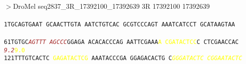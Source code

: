 \documentclass[11pt,twoside,reqno,a4paper]{article}
\begin{document}
\\
$>$DroMel	seq2837\_3R\_17392100\_17392639	3R	17392100	17392639 \\
 \\
\texttt{1\hspace*{3\charwidth}TGCAGTGAAT	GCAACTTGTA	AATCTGTCAC	GCGTCCCAGT	AAATCATCCT	GCATAAGTAA	\\
\hspace*{4\charwidth}\hspace*{1\charwidth}\hspace*{1\charwidth}\hspace*{1\charwidth}\hspace*{1\charwidth}\hspace*{1\charwidth}\hspace*{1\charwidth}\\
61\hspace*{2\charwidth}TGTGC\textit{\textcolor{Brown}{A}}\textit{\textcolor{Brown}{G}}\textit{\textcolor{Brown}{T}}\textit{\textcolor{Brown}{T}}\textit{\textcolor{Brown}{T}}	\textit{\textcolor{Brown}{A}}\textit{\textcolor{Brown}{G}}\textit{\textcolor{Brown}{C}}\textit{\textcolor{Brown}{C}}\textit{\textcolor{Brown}{C}}GGAGA	ACACACCCAG	AATTCGAAA\textcolor{Yellow}{A}	\textcolor{Yellow}{C}\textcolor{Yellow}{G}\textcolor{Yellow}{A}\textcolor{Yellow}{T}\textcolor{Yellow}{A}\textcolor{Yellow}{C}\textcolor{Yellow}{T}\textcolor{Yellow}{C}\textcolor{Yellow}{C}C	CTCGAACCAC	\\
\hspace*{4\charwidth}\hspace*{5\charwidth}\textit{\textcolor{Brown}{9.2}}\hspace*{1\charwidth}\hspace*{1\charwidth}\hspace*{1\charwidth}\hspace*{31\charwidth}\textcolor{Yellow}{9.0}\hspace*{1\charwidth}\hspace*{1\charwidth}\hspace*{1\charwidth}\\
121\hspace*{1\charwidth}TTTGTCACTC	\textcolor{Yellow}{G}\textcolor{Yellow}{A}\textcolor{Yellow}{G}\textcolor{Yellow}{A}\textcolor{Yellow}{T}\textcolor{Yellow}{A}\textcolor{Yellow}{C}\textcolor{Yellow}{T}\textcolor{Yellow}{C}\textcolor{Yellow}{G}	AAATACCCGA	GGAGACACTG	C\textit{\textcolor{Yellow}{G}}\textit{\textcolor{Yellow}{G}}\textit{\textcolor{Yellow}{G}}\textit{\textcolor{Yellow}{A}}\textit{\textcolor{Yellow}{T}}\textit{\textcolor{Yellow}{A}}\textit{\textcolor{Yellow}{C}}\textit{\textcolor{Yellow}{T}}\textit{\textcolor{Yellow}{C}}	\textit{\textcolor{Yellow}{C}}\textit{\textcolor{Yellow}{G}}\textit{\textcolor{Yellow}{G}}\textit{\textcolor{Yellow}{A}}\textit{\textcolor{Yellow}{A}}\textit{\textcolor{Yellow}{T}}\textit{\textcolor{Yellow}{A}}\textit{\textcolor{Yellow}{C}}\textit{\textcolor{Yellow}{T}}\textit{\textcolor{Yellow}{C}}	\\
}
\end{document}
